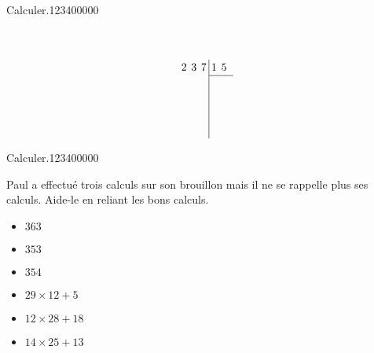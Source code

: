 \begin{pageAD}
\begin{ExoCad}{Calculer.}{1234}{0}{0}{0}{0}{0}
\begin{minipage}{0.3\linewidth}
\begin{equation*}
\begin{array}{rrrr|rrr}
    &  &   &   &   &   &  \\
     &   &   &   &   &   &  \\
    &&  &   &   &   &  \\
  \end{array}
\end{equation*}
\end{minipage}
\begin{minipage}{0.3\linewidth}
\begin{equation*}
\renewcommand{\arraystretch}{1.2}
\renewcommand{\arraycolsep}{2pt}
  \begin{array}{rrrr|rrr}
 & 2  & 3 & 7 & 1 & 5 \\
\cline{5-7}
 & &  &  &  & \\
    & &  &  &   &   &  \\
    &  &  &  &   &   &  \\
    &&  &  &   &   &  \\
  \end{array}
\end{equation*}
\end{minipage}



 
\end{ExoCad}

\begin{ExoCad}{Calculer.}{1234}{0}{0}{0}{0}{0}

Paul a effectué trois calculs sur son brouillon mais il ne se rappelle plus ses calculs. Aide-le en reliant les bons calculs. \vspace{0.1cm}

\begin{minipage}{0.3\linewidth}
\begin{itemize}
\item $363$
\item $353$
\item $354$
\end{itemize}
\end{minipage}
\begin{minipage}{0.2\linewidth}

\end{minipage}
\begin{minipage}{0.3\linewidth}
\begin{itemize}
\item $29 \times 12 + 5 $
\item $12 \times 28 + 18 $
\item $14 \times 25 + 13 $
\end{itemize}
\end{minipage}
\end{ExoCad}


\end{pageAD}
